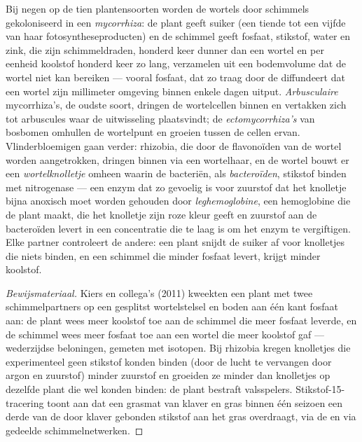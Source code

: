\begin{proposition}\label{prop:b2:living-soil:symbiosis}
Bij negen op de tien plantensoorten worden de wortels door schimmels
gekoloniseerd in een \emph{mycorrhiza}: de plant geeft suiker (een tiende tot
een vijfde van haar fotosyntheseproducten) en de schimmel geeft fosfaat,
stikstof, water en zink, die zijn schimmeldraden, honderd keer dunner dan een
wortel en per eenheid koolstof honderd keer zo lang, verzamelen uit een
bodemvolume dat de wortel niet kan bereiken --- vooral fosfaat, dat zo traag
door de  diffundeert dat een wortel zijn millimeter omgeving binnen enkele
dagen uitput. \emph{Arbusculaire} mycorrhiza's, de oudste soort, dringen de
wortelcellen binnen en vertakken zich tot arbuscules waar de uitwisseling
plaatsvindt; de \emph{ectomycorrhiza's} van bosbomen omhullen de wortelpunt en
groeien tussen de cellen ervan. Vlinderbloemigen gaan verder: rhizobia, die
door de flavonoïden van de wortel worden aangetrokken, dringen binnen via een
wortelhaar, en de wortel bouwt er een \emph{wortelknolletje} omheen waarin de
bacteriën, als \emph{bacteroïden}, stikstof binden met nitrogenase --- een
enzym dat zo gevoelig is voor zuurstof dat het knolletje bijna anoxisch moet
worden gehouden door \emph{leghemoglobine}, een hemoglobine die de plant maakt,
die het knolletje zijn roze kleur geeft en zuurstof aan de bacteroïden levert
in een concentratie die te laag is om het enzym te vergiftigen. Elke partner
controleert de andere: een plant snijdt de suiker af voor knolletjes die niets
binden, en een schimmel die minder fosfaat levert, krijgt minder
koolstof.
\end{proposition}
\begin{proof}[Bewijsmateriaal]
Kiers en collega's (2011) kweekten een plant met twee schimmelpartners op
een gesplitst wortelstelsel en boden aan één kant fosfaat aan:
de plant wees meer koolstof toe aan de schimmel die meer fosfaat leverde, en de
schimmel wees meer fosfaat toe aan een wortel die meer koolstof gaf ---
wederzijdse beloningen, gemeten met isotopen. Bij rhizobia kregen knolletjes
die experimenteel geen stikstof konden binden (door de lucht te vervangen door
argon en zuurstof) minder zuurstof en groeiden ze minder dan knolletjes op
dezelfde plant die wel konden binden: de plant bestraft valsspelers.
Stikstof-15-tracering toont aan dat een grasmat van klaver en gras binnen één
seizoen een derde van de door klaver gebonden stikstof aan het gras
overdraagt, via de  en via gedeelde schimmelnetwerken.
\end{proof}

